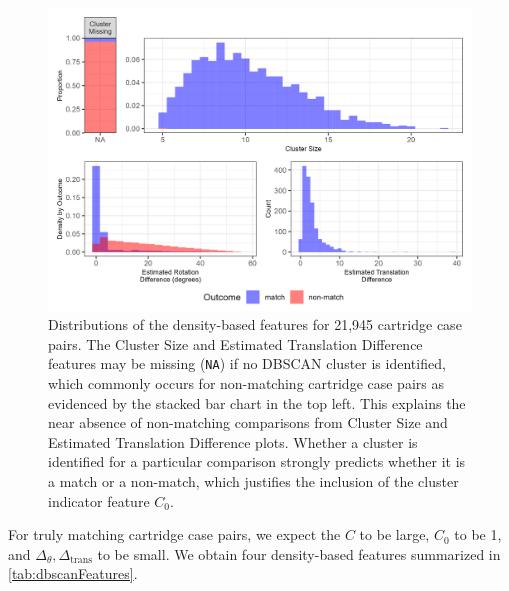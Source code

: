 \documentclass[
]{jdssv}
\begin{document}
\begin{CodeChunk}
\begin{figure}[htbp]

{\centering \includegraphics[width=\textwidth]{images/densityFeatureDistributions} 

}

\caption{\label{fig:densityDistributions} Distributions of the density-based features for 21,945 cartridge case pairs. The Cluster Size and Estimated Translation Difference features may be missing (\texttt{NA}) if no DBSCAN cluster is identified, which commonly occurs for non-matching cartridge case pairs as evidenced by the stacked bar chart in the top left. This explains the near absence of non-matching comparisons from Cluster Size and Estimated Translation Difference plots. Whether a cluster is identified for a particular comparison strongly predicts whether it is a match or a non-match, which justifies the inclusion of the cluster indicator feature $C_0$.}\label{fig:unnamed-chunk-15}
\end{figure}
\end{CodeChunk}

For truly matching cartridge case pairs, we expect the \(C\) to be
large, \(C_0\) to be 1, and \(\Delta_\theta, \Delta_{\text{trans}}\) to
be small. We obtain four density-based features summarized in
\autoref{tab:dbscanFeatures}.
\end{document}
